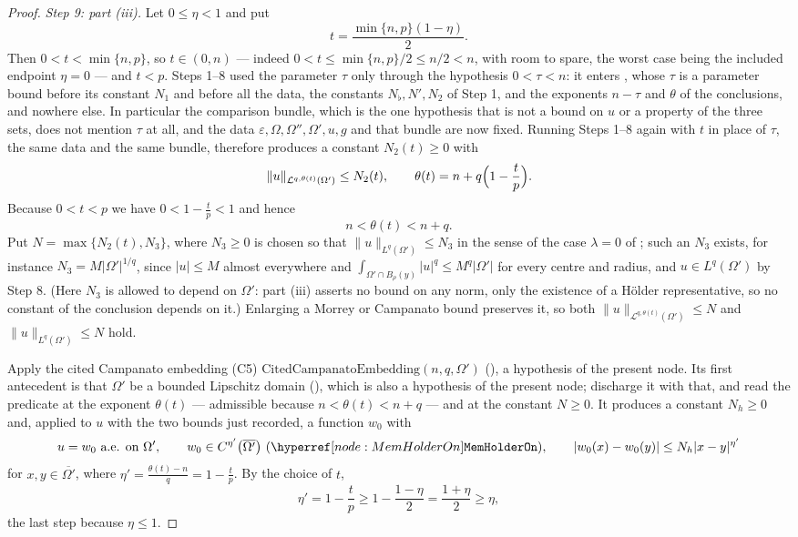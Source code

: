\begin{proof}
\emph{Step 9: part (iii).}  Let $0\le\eta<1$ and put
\[
t=\frac{\min\{n,p\}(1-\eta)}2 .
\]
Then $0<t<\min\{n,p\}$, so $t\in(0,n)$ --- indeed
$0<t\le\min\{n,p\}/2\le n/2<n$, with room to spare, the worst case being the
included endpoint $\eta=0$ --- and $t<p$.  Steps 1--8 used the parameter $\tau$
only through the hypothesis $0<\tau<n$: it enters
, whose $\tau$ is a parameter bound before its
constant $N_1$ and before all the data, the constants $N_\flat,N',N_2$ of
Step 1, and the exponents $n-\tau$ and $\theta$ of the conclusions, and
nowhere else.  In particular the comparison bundle, which is the one hypothesis
that is not a bound on $u$ or a property of the three sets, does not mention
$\tau$ at all, and the data
$\varepsilon,\Omega,\Omega'',\Omega',u,g$ and that bundle are now fixed.
Running Steps 1--8 again with $t$ in place of $\tau$, the same data and the same
bundle, therefore produces a constant $N_2(t)\ge0$ with
\[
\|u\|_{\mathcal L^{q,\theta(t)}(\Omega')}\le N_2(t),
\qquad \theta(t)=n+q\Bigl(1-\frac tp\Bigr).
\]
Because $0<t<p$ we have $0<1-\frac tp<1$ and hence
\[
n<\theta(t)<n+q .
\]
Put $N=\max\{N_2(t),N_3\}$, where $N_3\ge0$ is chosen so that
$\|u\|_{L^q(\Omega')}\le N_3$ in the sense of the case $\lambda=0$ of
; such an $N_3$ exists, for instance
$N_3=M\bigl|\Omega'\bigr|^{1/q}$, since $|u|\le M$ almost everywhere and
$\int_{\Omega'\cap B_{\rho}(y)}|u|^q\le M^q|\Omega'|$ for every centre and
radius, and $u\in L^q(\Omega')$ by Step 8.  (Here $N_3$ is allowed to depend on
$\Omega'$: part (iii) asserts no bound on any norm, only the existence of a
H\"older representative, so no constant of the conclusion depends on it.)
Enlarging a Morrey or Campanato bound preserves it, so both
$\|u\|_{\mathcal L^{q,\theta(t)}(\Omega')}\le N$ and
$\|u\|_{L^{q}(\Omega')}\le N$ hold.

Apply the cited Campanato embedding (C5)
$\mathrm{CitedCampanatoEmbedding}(n,q,\Omega')$
(), a hypothesis of the present node.  Its
first antecedent is that $\Omega'$ be a bounded Lipschitz domain
(), which is also a hypothesis of the present
node; discharge it with that, and read the predicate at the
exponent $\theta(t)$ --- admissible because $n<\theta(t)<n+q$ --- and at the
constant $N\ge0$.  It produces a constant $N_h\ge0$ and, applied to $u$ with the
two bounds just recorded, a function $w_0$ with
\[
u=w_0\ \text{a.e. on }\Omega',
\qquad
w_0\in C^{\eta'}\bigl(\overline{\Omega'}\bigr)\ (\noderef{MemHolderOn}),
\qquad
|w_0(x)-w_0(y)|\le N_h|x-y|^{\eta'}
\]
for $x,y\in\overline{\Omega'}$, where
$\eta'=\frac{\theta(t)-n}q=1-\frac tp$.  By the choice of $t$,
\[
\eta'=1-\frac tp\ge1-\frac{1-\eta}2=\frac{1+\eta}2\ge\eta ,
\]
the last step because $\eta\le1$.


\end{proof}
